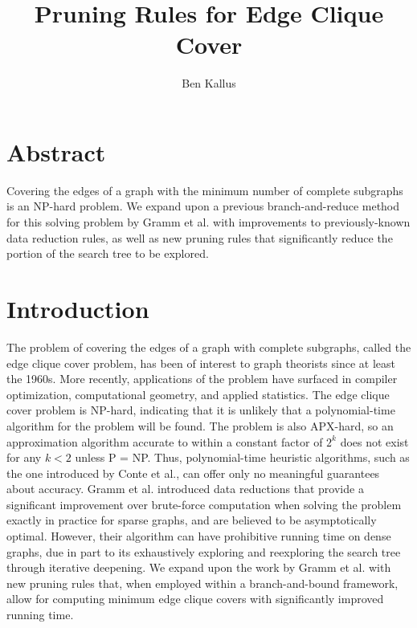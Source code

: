 \documentclass[12pt]{article}
\title{Pruning Rules for Edge Clique Cover}
\author{Ben Kallus}
\date{}
\begin{document}
\maketitle

\section*{Abstract}

    Covering the edges of a graph with the minimum number of complete subgraphs is an NP-hard problem.
    We expand upon a previous branch-and-reduce method for this solving problem by Gramm et al. with improvements to previously-known data reduction rules, as well as new pruning rules that significantly reduce the portion of the search tree to be explored.

\section*{Introduction}

    The problem of covering the edges of a graph with complete subgraphs, called the edge clique cover problem, has been of interest to graph theorists since at least the 1960s. %
    More recently, applications of the problem have surfaced in compiler optimization, computational geometry, and applied statistics. %
    The edge clique cover problem is NP-hard, indicating that it is unlikely that a polynomial-time algorithm for the problem will be found.
    The problem is also APX-hard, so an approximation algorithm accurate to within a constant factor of $2^k$ does not exist for any $k < 2$ unless P = NP. %
    Thus, polynomial-time heuristic algorithms, such as the one introduced by Conte et al., can offer only no meaningful guarantees about accuracy. %
    Gramm et al. introduced data reductions that provide a significant improvement over brute-force computation when solving the problem exactly in practice for sparse graphs, and are believed to be asymptotically optimal. %
    However, their algorithm can have prohibitive running time on dense graphs, due in part to its exhaustively exploring and reexploring the search tree through iterative deepening.
    We expand upon the work by Gramm et al. with new pruning rules that, when employed within a branch-and-bound framework, allow for computing minimum edge clique covers with significantly improved running time.
\end{document}
